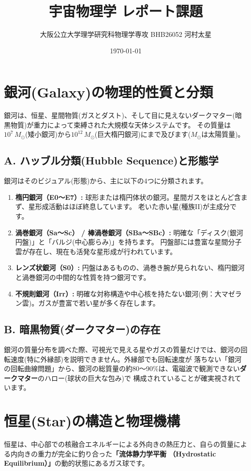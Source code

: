 \documentclass[11pt,a4paper]{article}
\title{宇宙物理学 レポート課題}
\author{大阪公立大学理学研究科物理学専攻 BHB26052 河村太星}
\date{\today}
\begin{document}
\maketitle

\section{銀河(Galaxy)の物理的性質と分類}
銀河は、恒星、星間物質(ガスとダスト)、そして目に見えないダークマター(暗黒物質)が重力によって束縛された大規模な天体システムです。
その質量は$10^7 \, M_\odot$(矮小銀河)から$10^{12} \, M_\odot$(巨大楕円銀河)にまで及びます($M_\odot$は太陽質量)。

\subsection{A. ハッブル分類(Hubble Sequence)と形態学}
銀河はそのビジュアル(形態)から、主に以下の4つに分類されます。
\begin{enumerate}
    \item \textbf{楕円銀河（E0〜E7）:} 球形または楕円体状の銀河。星間ガスをほとんど含まず、星形成活動はほぼ終息しています。
    老いた赤い星(種族II)が主成分です。
    \item \textbf{渦巻銀河（Sa〜Sc） / 棒渦巻銀河（SBa〜SBc）:} 明確な「ディスク(銀河円盤)」と「バルジ(中心膨らみ)」を持ちます。
    円盤部には豊富な星間分子雲が存在し、現在も活発な星形成が行われています。
    \item \textbf{レンズ状銀河（S0）:} 円盤はあるものの、渦巻き腕が見られない、楕円銀河と渦巻銀河の中間的な性質を持つ銀河です。
    \item \textbf{不規則銀河（Irr）:} 明確な対称構造や中心核を持たない銀河(例：大マゼラン雲)。ガスが豊富で若い星が多く存在します。
\end{enumerate}

\subsection{B. 暗黒物質(ダークマター)の存在}
銀河の質量分布を調べた際、可視光で見える星やガスの質量だけでは、銀河の回転速度(特に外縁部)を説明できません。外縁部でも回転速度が
落ちない「銀河の回転曲線問題」から、銀河の総質量の約80〜90\%は、電磁波で観測できない\textbf{ダークマター}のハロー(球状の巨大な包み)で
構成されていることが確実視されています。

\section{恒星(Star)の構造と物理機構}
恒星は、中心部での核融合エネルギーによる外向きの熱圧力と、自らの質量による内向きの重力が完全に釣り合った\textbf{「流体静力学平衡
（Hydrostatic Equilibrium）」}の動的状態にあるガス球です。
\end{document}
